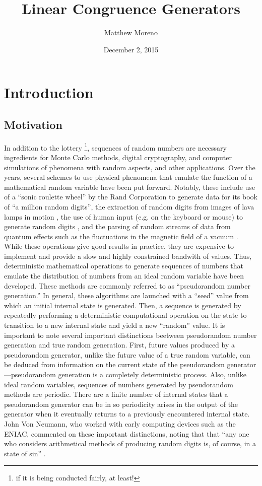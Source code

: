 \documentclass{article}
\theoremstyle{break}
\begin{document}
\title{Linear Congruence Generators}
\author{Matthew Moreno}
\date{December 2, 2015}
\maketitle

\section{Introduction}
\subsection{Motivation}
In addition to the lottery \footnote{if it is being conducted fairly, at least!}, sequences of random numbers are necessary ingredients for Monte Carlo methods, digital cryptography, and computer simulations of phenomena with random aspects, and other applications. Over the years, several schemes to use physical phenomena that emulate the function of a mathematical random variable have been put forward. Notably, these include use of a ``sonic roulette wheel'' by the Rand Corporation to generate data for its book of ``a million random digits''\autocite{rand_corporation_million_2001}, the extraction of random digits from images of lava lamps in motion \autocite{noll_method_1998}, the use of human input (e.g. on the keyboard or mouse) to generate random digits  \autocite{cole_network_2011}, and the parsing of random streams of data from quantum effects such as the fluctuations in the magnetic field of a vacuum
 \autocite{_anu_????}. While these operations give good results in practice, they are expensive to implement and provide a slow and highly constrained bandwith of values. Thus, deterministic mathematical operations to generate sequences of numbers that emulate the distribution of numbers from an ideal random variable have been developed. These methods are commonly referred to as ``pseudorandom number generation.'' In general, these algorithms are launched with a ``seed'' value from which an initial internal state is generated. Then, a sequence is generated by repeatedly performing a deterministic computational operation on the state to transition to a new internal state and yield a new ``random'' value.
 It is important to note several important distinctions beetween pseudorandom number generation and true random generation. First, future values produced by a pseudorandom generator, unlike the future value of a true random variable, can be deduced from information on the current state of the pseudorandom generator---pseudorandom generation is a completely deterministic process. Also, unlike ideal random variables, sequences of numbers generated by pseudorandom methods are periodic. There are a finite number of internal states that a pseudorandom generator can be in so periodicity arises in the output of the generator when it eventually returns to a previously encountered internal state. John Von Neumann, who worked with early computing devices such as the ENIAC, commented on these important distinctions, noting that that ``any one who considers arithmetical methods of producing random digits is, of course, in a state of sin'' \autocite{neumann_various_1950}.
\end{document}
